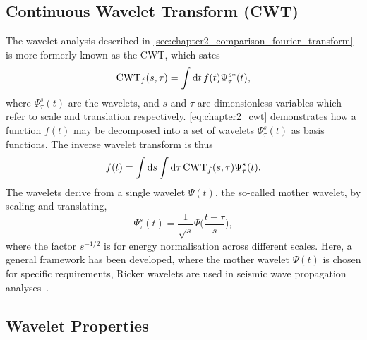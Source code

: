 



\subsection{Continuous Wavelet Transform (CWT)}\label{sec:chapter2_continuous_wavelet_transform}

The wavelet analysis described in \cref{sec:chapter2_comparison_fourier_transform} is more formerly known as the CWT, which sates
%
\begin{equation}\label{eq:chapter2_cwt}
	\text{CWT}_{f}(s,\tau)
	= \int\dd{t} f(t) \Psi^{s\ast}_{\tau}(t),
\end{equation}
%
where \(\Psi^{s}_{\tau}(t)\) are the wavelets, and \(s\) and \(\tau{}\) are dimensionless variables which refer to scale and translation respectively.
\cref{eq:chapter2_cwt} demonstrates how a function \(f(t)\) may be decomposed into a set of wavelets \(\Psi^{s}_{\tau}(t)\) as basis functions.
The inverse wavelet transform is thus
%
\begin{equation}
	f(t)
	= \int\dd{s} \int\dd{\tau} \text{CWT}_{f}(s,\tau) \Psi^{s}_{\tau}(t).
\end{equation}
%
The wavelets derive from a single wavelet \(\Psi(t)\), the so-called mother wavelet, by scaling and translating, \ie{}
%
\begin{equation}\label{eq:chapter2_mother_wavelet}
	\Psi^{s}_{\tau}(t)
	= \frac{1}{\sqrt{s}} \Psi\bigg(\frac{t-\tau}{s}\bigg),
\end{equation}
%
where the factor \(s^{-1/2}\) is for energy normalisation across different scales.
Here, a general framework has been developed, where the mother wavelet \(\Psi(t)\) is chosen for specific requirements, \eg{} Ricker wavelets are used in seismic wave propagation analyses~\cite{Wang2014}.

\subsection{Wavelet Properties}

